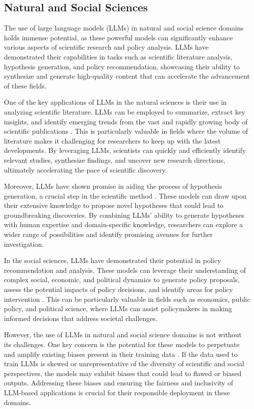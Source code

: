 \documentclass[11pt]{article}
\begin{document}
\subsection{Natural and Social Sciences}

The use of large language models (LLMs) in natural and social science domains holds immense potential, as these powerful models can significantly enhance various aspects of scientific research and policy analysis. LLMs have demonstrated their capabilities in tasks such as scientific literature analysis, hypothesis generation, and policy recommendation, showcasing their ability to synthesize and generate high-quality content that can accelerate the advancement of these fields.

One of the key applications of LLMs in the natural sciences is their use in analyzing scientific literature. LLMs can be employed to summarize, extract key insights, and identify emerging trends from the vast and rapidly growing body of scientific publications \cite{ref225}. This is particularly valuable in fields where the volume of literature makes it challenging for researchers to keep up with the latest developments. By leveraging LLMs, scientists can quickly and efficiently identify relevant studies, synthesize findings, and uncover new research directions, ultimately accelerating the pace of scientific discovery.

Moreover, LLMs have shown promise in aiding the process of hypothesis generation, a crucial step in the scientific method \cite{ref226}. These models can draw upon their extensive knowledge to propose novel hypotheses that could lead to groundbreaking discoveries. By combining LLMs' ability to generate hypotheses with human expertise and domain-specific knowledge, researchers can explore a wider range of possibilities and identify promising avenues for further investigation.

In the social sciences, LLMs have demonstrated their potential in policy recommendation and analysis. These models can leverage their understanding of complex social, economic, and political dynamics to generate policy proposals, assess the potential impacts of policy decisions, and identify areas for policy intervention \cite{ref227}. This can be particularly valuable in fields such as economics, public policy, and political science, where LLMs can assist policymakers in making informed decisions that address societal challenges.

However, the use of LLMs in natural and social science domains is not without its challenges. One key concern is the potential for these models to perpetuate and amplify existing biases present in their training data \cite{ref228}. If the data used to train LLMs is skewed or unrepresentative of the diversity of scientific and social perspectives, the models may exhibit biases that could lead to flawed or biased outputs. Addressing these biases and ensuring the fairness and inclusivity of LLM-based applications is crucial for their responsible deployment in these domains.
\end{document}
